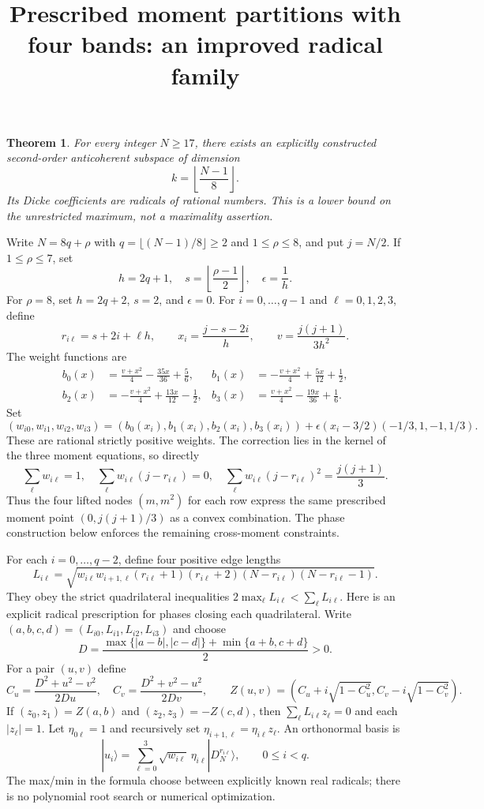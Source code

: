 \documentclass[11pt]{article}
\newtheorem{theorem}{Theorem}
\begin{document}
\title{Prescribed moment partitions with four bands: an improved radical family}
\author{}\date{}\maketitle
\begin{theorem}
For every integer $N\ge17$, there exists an explicitly constructed
second-order anticoherent subspace of dimension
\[
 k=\left\lfloor\frac{N-1}{8}\right\rfloor.
\]
Its Dicke coefficients are radicals of rational numbers. This is a lower
bound on the unrestricted maximum, not a maximality assertion.
\end{theorem}
Write $N=8q+\rho$ with $q=\lfloor(N-1)/8\rfloor\ge2$ and
$1\le\rho\le8$, and put $j=N/2$. If $1\le\rho\le7$, set
\[
 h=2q+1,\quad s=\left\lfloor\frac{\rho-1}{2}\right\rfloor,
 \quad \epsilon=\frac1h.
\]
For $\rho=8$, set $h=2q+2$, $s=2$, and $\epsilon=0$.
For $i=0,\ldots,q-1$ and $\ell=0,1,2,3$, define
\[
 r_{i\ell}=s+2i+\ell h,\qquad x_i=\frac{j-s-2i}{h},
 \qquad v=\frac{j(j+1)}{3h^2}.
\]
The weight functions are
\begin{align*}
 b_0(x)&=\frac{v+x^2}{4}-\frac{35x}{36}+\frac56,&
 b_1(x)&=-\frac{v+x^2}{4}+\frac{5x}{12}+\frac12,\\
 b_2(x)&=-\frac{v+x^2}{4}+\frac{13x}{12}-\frac12,&
 b_3(x)&=\frac{v+x^2}{4}-\frac{19x}{36}+\frac16.
\end{align*}
Set
\[
 (w_{i0},w_{i1},w_{i2},w_{i3})=
 (b_0(x_i),b_1(x_i),b_2(x_i),b_3(x_i))
 +\epsilon(x_i-3/2)(-1/3,1,-1,1/3).
\]
These are rational strictly positive weights. The correction lies in the
kernel of the three moment equations, so directly
\[
 \sum_\ell w_{i\ell}=1,\quad
 \sum_\ell w_{i\ell}(j-r_{i\ell})=0,\quad
 \sum_\ell w_{i\ell}(j-r_{i\ell})^2=\frac{j(j+1)}3.
\]
Thus the four lifted nodes $(m,m^2)$ for each row express the same prescribed
moment point $(0,j(j+1)/3)$ as a convex combination. The phase construction
below enforces the remaining cross-moment constraints.

For each $i=0,\ldots,q-2$, define four positive edge lengths
\[
 L_{i\ell}=\sqrt{w_{i\ell}w_{i+1,\ell}
 (r_{i\ell}+1)(r_{i\ell}+2)(N-r_{i\ell})(N-r_{i\ell}-1)}.
\]
They obey the strict quadrilateral inequalities
$2\max_\ell L_{i\ell}<\sum_\ell L_{i\ell}$.
Here is an explicit radical prescription for phases closing each
quadrilateral. Write $(a,b,c,d)=(L_{i0},L_{i1},L_{i2},L_{i3})$ and choose
\[
 D=\frac{\max\{|a-b|,|c-d|\}+\min\{a+b,c+d\}}2>0.
\]
For a pair $(u,v)$ define
\[
 C_u=\frac{D^2+u^2-v^2}{2Du},\quad
 C_v=\frac{D^2+v^2-u^2}{2Dv},\qquad
 Z(u,v)=\left(C_u+i\sqrt{1-C_u^2},
 C_v-i\sqrt{1-C_v^2}\right).
\]
If $(z_0,z_1)=Z(a,b)$ and $(z_2,z_3)=-Z(c,d)$, then
$\sum_\ell L_{i\ell}z_\ell=0$ and each $|z_\ell|=1$.
Let $\eta_{0\ell}=1$ and recursively set
$\eta_{i+1,\ell}=\eta_{i\ell}z_\ell$. An orthonormal basis is
\[
 |u_i\rangle=\sum_{\ell=0}^3\sqrt{w_{i\ell}}\,
 \eta_{i\ell}|D_N^{r_{i\ell}}\rangle,
 \qquad 0\le i<q.
\]
The max/min in the formula choose between explicitly known real radicals;
there is no polynomial root search or numerical optimization.
\end{document}
